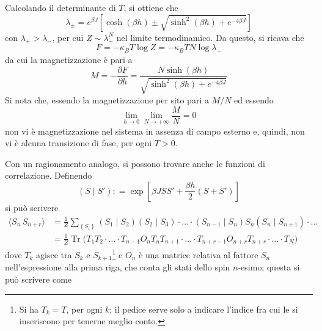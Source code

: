 \documentclass[11pt, a4paper]{scrartcl}
\theoremstyle{style}
\theoremstyle{style1}
\numberwithin{equation}{subsection}
\begin{document}
Calcolando il determinante di $T$, si ottiene che 
\[
\lambda _{\pm}  = e^{\beta J} \left[ \cosh (\beta h) \pm \sqrt{\sinh^2 (\beta h) + e ^{-4 \beta J}}  \right] 
\] 
con $\lambda _+ > \lambda _-$, per cui $Z \sim \lambda _+ ^{N}$ nel limite termodinamico.
Da questo, si ricava che 
\[
F = - \kappa _B T \log Z = - \kappa _B T N \log \lambda _+
\] 
da cui la magnetizzazione \`e pari a 
\[
M = -\frac{\partial F}{\partial h} = \frac{N \sinh (\beta h)}{\sqrt{\sinh^2 (\beta h) + e^{-4 \beta J}} }
\] 
Si nota che, essendo la magnetizzazione per sito pari a $M / N$ ed essendo
\[
\lim_{h \to 0} \lim_{N \to +\infty} \frac{M}{N} = 0
\] 
non vi \`e magnetizzazione nel sistema in assenza di campo esterno e, quindi, non vi \`e alcuna transizione di fase, per ogni $T>0$.
\begin{center}
\end{center}
Con un ragionamento analogo, si possono trovare anche le funzioni di correlazione.
Definendo 
\[
	(S \mid S') : = \exp \left[ \beta JS S' + \frac{\beta h}{2}(S+S')\right] 
\] 
si pu\`o scrivere
\[
	\begin{split}
		\langle S_n \, S_{n+r}  \rangle &= \frac{1}{Z}\sum_{\left\{ S_i \right\} }^{} (S_1 \mid S_2) (S_2 \mid S_3) \cdot \ldots\cdot (S_{n-1}  \mid S_n) S_n (S_n  \mid S_{n+1} ) \cdot  \ldots\\
						&=\frac{1}{Z} \operatorname{Tr} \Big(T_1T_2\cdot \ldots \cdot T_{n-1} O_n T_n T_{n+1} \cdot \ldots \cdot T_{n+r-1} O_{n+r} T_{n+r} \cdot \ldots\cdot T_N  \Big) 
	\end{split}
\] 
dove $T_k$ agisce tra $S_k$ e $S_{k+1} $\footnote{Si ha $T_k = T$, per ogni $k$; il pedice serve solo a indicare l'indice fra cui le si inseriscono per tenerne meglio conto.} e $O_n$ \`e una matrice relativa al fattore $S_n$ nell'espressione alla prima riga, che conta gli stati dello spin $n$-esimo; questa si pu\`o scrivere come
\end{document}
